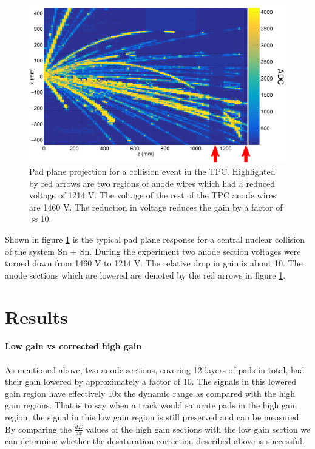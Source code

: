 \documentclass[review]{elsarticle}
\begin{document}
\begin{figure}[ht]
\label{fig:data}
\includegraphics[width=\linewidth]{data}
\caption{Pad plane projection for a collision event in the TPC. Highlighted by red arrows are two regions of anode wires which had a reduced voltage of 1214 V. The voltage of the rest of the TPC anode wires are 1460 V. The reduction in voltage reduces the gain by a factor of $\approx$10. }
\end{figure}

Shown in figure \ref{fig:data} is the typical pad plane response for a central nuclear collision of the system ${}^{}$Sn + ${}^{}$Sn. During the experiment two anode section voltages were turned down from 1460 V to 1214 V. The relative drop in gain is about 10. The anode sections which are lowered are denoted by the red arrows in figure \ref{fig:data}. 


\section{Results}
\paragraph{Low gain vs corrected high gain}

As mentioned above, two anode sections, covering 12 layers of pads in total, had their gain lowered by approximately a factor of 10. The signals in this lowered gain region have effectively 10x the dynamic range as compared with the high gain regions. That is to say when a track would saturate pads in the high gain region, the signal in this low gain region is still preserved and can be measured. By comparing the $\frac{dE}{dx}$ values of the high gain sections with the low gain section we can determine whether the desaturation correction described above is successful. 
\end{document}
